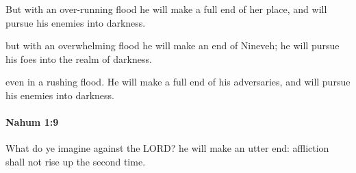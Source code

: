 			\begin{versebox}
					\item[BHS] 
					\item[LXX] 
					\item[ASV] But with an over-running flood he will make a full end of her place, and will pursue his enemies into darkness.
					\item[NIV] but with an overwhelming flood he will make an end of Nineveh; he will pursue his foes into the realm of darkness.
					\item[NRSV] even in a rushing flood. He will make a full end of his adversaries, and will pursue his enemies into darkness.
			\end{versebox}

		\paragraph{Nahum 1:9} %
			\label{NAHUM-1-9}

			What do ye imagine against the LORD? he will make an utter end: affliction shall not rise up the second time.

